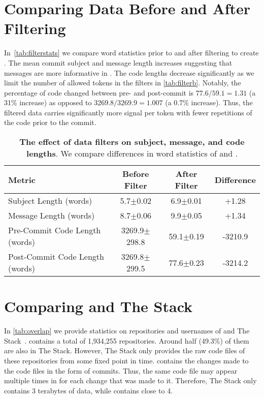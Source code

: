 \section{Comparing Data Before and After Filtering}

In~\autoref{tab:filterstats} we compare word statistics prior to and after filtering \data{} to create \dataft{}. The mean commit subject and message length increases suggesting that messages are more informative in \dataft{}. The code lengths decrease significantly as we limit the number of allowed tokens in the filters in \autoref{tab:filterb}. Notably, the percentage of code changed between pre- and post-commit is $77.6 / 59.1 = 1.31$ (a 31\% increase) as opposed to $3269.8 / 3269.9 = 1.007$ (a 0.7\% increase). Thus, the filtered data carries significantly more signal per token with fewer repetitions of the code prior to the commit.

\begin{table*}[htbp]
    \centering
    \begin{tabular}{l|ccc}
    \toprule
    Metric & Before Filter & After Filter & Difference \\
    \midrule
    Subject Length (words) & 5.7$\pm$0.02 & 6.9$\pm$0.01 & +1.28 \\
    Message Length (words) & 8.7$\pm$0.06 & 9.9$\pm$0.05 & +1.34 \\
    Pre-Commit Code Length (words) & 3269.9$\pm$298.8 & 59.1$\pm$0.19 & -3210.9 \\
    Post-Commit Code Length (words) & 3269.8$\pm$299.5 & 77.6$\pm$0.23 & -3214.2 \\   
    \bottomrule
    \end{tabular}
\caption{
        \textbf{The effect of data filters on subject, message, and code lengths}. We compare differences in word statistics of \data{} and \dataft{}.
    }
    \label{tab:filterstats}
\end{table*}



\section{Comparing \data{} and The Stack}
\label{sec:stack}

In \autoref{tab:overlap} we provide statistics on repositories and usernames of \data{} and The Stack~\citep{kocetkov2022stack}. \data{} contains a total of 1,934,255 repositories. Around half (49.3\%) of them are also in The Stack. However, The Stack only provides the raw code files of these repositories from some fixed point in time. \data{} contains the changes made to the code files in the form of commits. Thus, the same code file may appear multiple times in \data{} for each change that was made to it. Therefore, The Stack only contains 3 terabytes of data, while \data{} contains close to 4.


